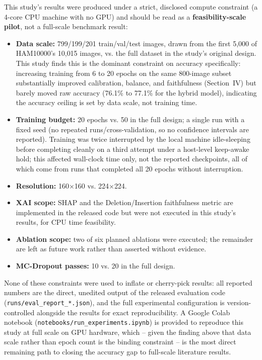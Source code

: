 \documentclass[conference]{IEEEtran}
\begin{document}
This study's results were produced under a strict, disclosed compute constraint (a 4-core
CPU machine with no GPU) and should be read as a \textbf{feasibility-scale pilot}, not a
full-scale benchmark result:
\begin{itemize}
\item \textbf{Data scale:} 799/199/201 train/val/test images, drawn from the first 5{,}000
of HAM10000's 10{,}015 images, vs. the full dataset in the study's original design. This
study finds this is the dominant constraint on accuracy specifically: increasing training
from 6 to 20 epochs on the same 800-image subset substantially improved calibration,
balance, and faithfulness (Section~IV) but barely moved raw accuracy (76.1\% to 77.1\% for
the hybrid model), indicating the accuracy ceiling is set by data scale, not training time.
\item \textbf{Training budget:} 20 epochs vs. 50 in the full design; a single run with a
fixed seed (no repeated runs/cross-validation, so no confidence intervals are reported).
Training was twice interrupted by the local machine idle-sleeping before completing cleanly
on a third attempt under a host-level keep-awake hold; this affected wall-clock time only,
not the reported checkpoints, all of which come from runs that completed all 20 epochs
without interruption.
\item \textbf{Resolution:} 160$\times$160 vs. 224$\times$224.
\item \textbf{XAI scope:} SHAP and the Deletion/Insertion faithfulness metric are
implemented in the released code but were not executed in this study's results, for CPU
time feasibility.
\item \textbf{Ablation scope:} two of six planned ablations were executed; the remainder are
left as future work rather than asserted without evidence.
\item \textbf{MC-Dropout passes:} 10 vs. 20 in the full design.
\end{itemize}
None of these constraints were used to inflate or cherry-pick results: all reported numbers
are the direct, unedited output of the released evaluation code
(\texttt{runs/eval\_report\_*.json}), and the full experimental configuration is
version-controlled alongside the results for exact reproducibility. A Google Colab notebook
(\texttt{notebooks/run\_experiments.ipynb}) is provided to reproduce this study at full
scale on GPU hardware, which -- given the finding above that data scale rather than epoch
count is the binding constraint -- is the most direct remaining path to closing the accuracy
gap to full-scale literature results.
\end{document}
